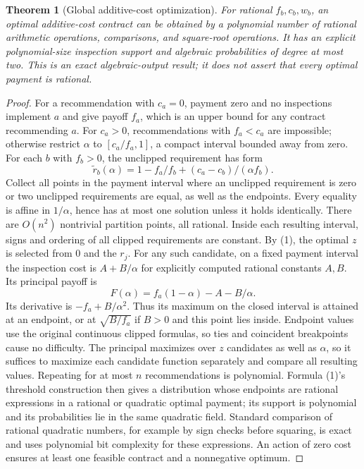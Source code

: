 \documentclass[11pt,a4paper]{article}
\newtheorem{theorem}{Theorem}
\begin{document}
\begin{theorem}[Global additive-cost optimization]
For rational $f_b,c_b,w_b$, an optimal additive-cost contract can be obtained by a polynomial number of rational arithmetic operations, comparisons, and square-root operations. It has an explicit polynomial-size inspection support and algebraic probabilities of degree at most two. This is an exact algebraic-output result; it does not assert that every optimal payment is rational.
\end{theorem}
\begin{proof}
For a recommendation with $c_a=0$, payment zero and no inspections implement $a$ and give payoff $f_a$, which is an upper bound for any contract recommending $a$. For $c_a>0$, recommendations with $f_a<c_a$ are impossible; otherwise restrict $\alpha$ to $[c_a/f_a,1]$, a compact interval bounded away from zero.
For each $b$ with $f_b>0$, the unclipped requirement has form
\[
 \widetilde r_b(\alpha)=1-f_a/f_b+(c_a-c_b)/(\alpha f_b).
\]
Collect all points in the payment interval where an unclipped requirement is zero or two unclipped requirements are equal, as well as the endpoints. Every equality is affine in $1/\alpha$, hence has at most one solution unless it holds identically. There are $O(n^2)$ nontrivial partition points, all rational. Inside each resulting interval, signs and ordering of all clipped requirements are constant.
By (1), the optimal $z$ is selected from $0$ and the $r_j$. For any such candidate, on a fixed payment interval the inspection cost is $A+B/\alpha$ for explicitly computed rational constants $A,B$. Its principal payoff is
\[
 F(\alpha)=f_a(1-\alpha)-A-B/\alpha.
\]
Its derivative is $-f_a+B/\alpha^2$. Thus its maximum on the closed interval is attained at an endpoint, or at $\sqrt{B/f_a}$ if $B>0$ and this point lies inside. Endpoint values use the original continuous clipped formulas, so ties and coincident breakpoints cause no difficulty.
The principal maximizes over $z$ candidates as well as $\alpha$, so it suffices to maximize each candidate function separately and compare all resulting values. Repeating for at most $n$ recommendations is polynomial. Formula (1)'s threshold construction then gives a distribution whose endpoints are rational expressions in a rational or quadratic optimal payment; its support is polynomial and its probabilities lie in the same quadratic field. Standard comparison of rational quadratic numbers, for example by sign checks before squaring, is exact and uses polynomial bit complexity for these expressions. An action of zero cost ensures at least one feasible contract and a nonnegative optimum.
\end{proof}
\end{document}
